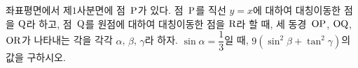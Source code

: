 좌표평면에서 제$1$사분면에 점~$\mathrm{P}$가 있다. 점~$\mathrm{P}$를 직선 $y=x$에 대하여 대칭이동한 점을 $\mathrm{Q}$라 하고, 점~$\mathrm{Q}$를 원점에 대하여 대칭이동한 점을 $\mathrm{R}$라 할 때, 세 동경~$\mathrm{OP}$, $\mathrm{OQ}$, $\mathrm{OR}$가 나타내는 각을 각각 $\alpha$, $\beta$, $\gamma$라 하자. $\sin\alpha=\dfrac{1}{3}$일 때, $9(\sin^2\beta+\tan^2\gamma)$의 값을 구하시오. 
